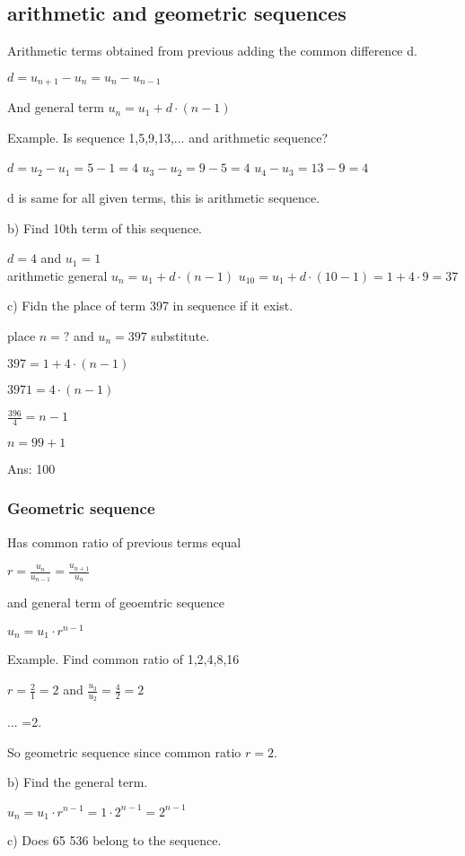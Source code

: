 \subsection{arithmetic and geometric sequences}

Arithmetic terms obtained from previous adding the common difference d.

$d=u_{n+1}-u_n=u_n-u_{n-1}$

And general term $u_n=u_1+d\cdot(n-1)$

Example. Is sequence 1,5,9,13,... and arithmetic sequence?

$d=u_2-u_1=5-1=4$
$u_3-u_2=9-5=4$
$u_4-u_3=13-9=4$

d is same for all given terms, this is arithmetic sequence.

b) Find 10th term of this sequence.

$d=4$ and $u_1=1$\\
arithmetic general $u_n=u_1+d\cdot(n-1)$
$u_10=u_1+d\cdot(10-1)=1+4\cdot9=37$

c) Fidn the place of term 397 in sequence if it exist.

place $n=?$ and $u_n=397$ substitute.

$397=1+4\cdot(n-1)$

$3971=4\cdot(n-1)$

$\frac{396}{4}=n-1$ 

$n=99+1$

Ans: 100

\subsubsection{Geometric sequence}

Has common ratio of previous terms equal

$r=\frac{u_n}{u_{n-1}}=\frac{u_{n+1}}{u_n}$ 

and general term of geoemtric sequence 

$u_n=u_1\cdot r^{n-1}$ 

Example. Find common ratio of 1,2,4,8,16 

$r=\frac{2}{1}=2$ and $\frac{u_3}{u_2}=\frac{4}{2}=2$

... =2. 

So geometric sequence since common ratio $r=2$. 

b) Find the general term. 

$u_n=u_1\cdot r^{n-1}=1\cdot 2^{n-1}=2^{n-1}$

c) Does 65 536 belong to the sequence.

